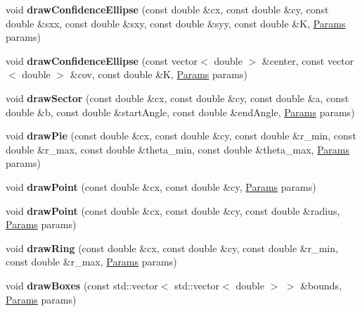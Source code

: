 \begin{DoxyCompactItemize}
void {\bfseries draw\+Confidence\+Ellipse} (const double \&cx, const double \&cy, const double \&sxx, const double \&sxy, const double \&syy, const double \&K, \hyperlink{classvibes_1_1_params}{Params} params)
\item 
\mbox{\label{namespacevibes_ad9e22b49412723fb3c464305353c5541}} 
void {\bfseries draw\+Confidence\+Ellipse} (const vector$<$ double $>$ \&center, const vector$<$ double $>$ \&cov, const double \&K, \hyperlink{classvibes_1_1_params}{Params} params)
\item 
\mbox{\label{namespacevibes_a66f1ec79b615d8a7f12a56ef2c619217}} 
void {\bfseries draw\+Sector} (const double \&cx, const double \&cy, const double \&a, const double \&b, const double \&start\+Angle, const double \&end\+Angle, \hyperlink{classvibes_1_1_params}{Params} params)
\item 
\mbox{\label{namespacevibes_a7360f9ac01a9c3099762b752cc199981}} 
void {\bfseries draw\+Pie} (const double \&cx, const double \&cy, const double \&r\+\_\+min, const double \&r\+\_\+max, const double \&theta\+\_\+min, const double \&theta\+\_\+max, \hyperlink{classvibes_1_1_params}{Params} params)
\item 
\mbox{\label{namespacevibes_ae0b38b24b59f7018bbf5f26f4fe7da39}} 
void {\bfseries draw\+Point} (const double \&cx, const double \&cy, \hyperlink{classvibes_1_1_params}{Params} params)
\item 
\mbox{\label{namespacevibes_aa17bc51c8c54f7c4e491c8fc96612cbb}} 
void {\bfseries draw\+Point} (const double \&cx, const double \&cy, const double \&radius, \hyperlink{classvibes_1_1_params}{Params} params)
\item 
\mbox{\label{namespacevibes_a9f85938523a858f2519ec056ef91609a}} 
void {\bfseries draw\+Ring} (const double \&cx, const double \&cy, const double \&r\+\_\+min, const double \&r\+\_\+max, \hyperlink{classvibes_1_1_params}{Params} params)
\item 
\mbox{\label{namespacevibes_a62f813c2a8914f3bd0c63b019ab9a96f}} 
void {\bfseries draw\+Boxes} (const std\+::vector$<$ std\+::vector$<$ double $>$ $>$ \&bounds, \hyperlink{classvibes_1_1_params}{Params} params)

\end{DoxyCompactItemize}
